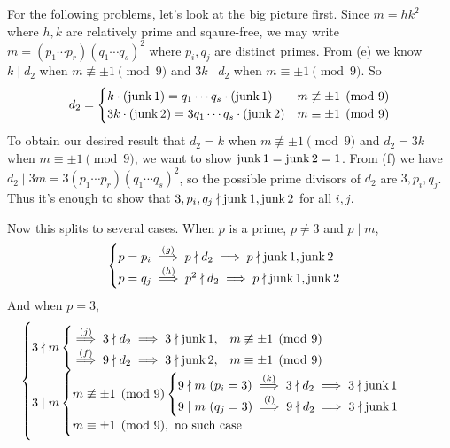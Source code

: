 \documentclass[../Marcus.tex]{subfiles}
\begin{document}
For the following problems, let's look at the big picture first. Since $m=hk^2$ where $h,k$ are relatively prime and sqaure-free, we may write $m=(p_1\cdots p_r)(q_1\cdots q_s)^2$ where $p_i,q_j$ are distinct primes. From (e) we know $k\mid d_2$ when $m\not\equiv \pm1 \pmod{9}$ and $3k\mid d_2$ when $m\equiv \pm1 \pmod{9}$. So
$$
d_2 =
\begin{cases}
    k\cdot(\operatorname{junk}1) = q_1\cdots q_s\cdot(\operatorname{junk}1) & m\not\equiv \pm1 \pmod{9} \\
    3k\cdot(\operatorname{junk}2) = 3q_1\cdots q_s\cdot(\operatorname{junk}2) & m\equiv \pm1 \pmod{9}
\end{cases}
$$
To obtain our desired result that $d_2=k$ when $m\not\equiv \pm1 \pmod{9}$ and $d_2=3k$ when $m\equiv \pm1 \pmod{9}$, we want to show $\operatorname{junk}1=\operatorname{junk}2=1$. From (f) we have $d_2\mid 3m=3(p_1\cdots p_r)(q_1\cdots q_s)^2$, so the possible prime divisors of $d_2$ are $3,p_i,q_j$. Thus it's enough to show that $3,p_i,q_j\nmid\operatorname{junk}1,\operatorname{junk}2$ for all $i,j$.

Now this splits to several cases. When $p$ is a prime, $p\neq 3$ and $p\mid m$,
$$
\begin{cases}
    p=p_i \overset{(g)}{\implies} p\nmid d_2 \implies p\nmid\jk1,\jk2 \\
    p=q_j \overset{(h)}{\implies} p^2\nmid d_2 \implies p\nmid\jk1,\jk2 \\
\end{cases}
$$
And when $p=3$,
$$
\begin{cases}
    3\nmid m
    \begin{cases}
        \overset{(j)}{\implies} 3\nmid d_2 \implies 3\nmid\jk1, & m\not\equiv \pm1 \pmod{9} \\
        \overset{(f)}{\implies} 9\nmid d_2 \implies 3\nmid\jk2, & m\equiv \pm1 \pmod{9}
    \end{cases}\\

3\mid m
    \begin{cases}
        m\not\equiv \pm1 \pmod{9}
        \begin{cases}
            9\nmid m \ ( p_i=3) \overset{(k)}{\implies} 3\nmid d_2 \implies 3\nmid\jk1 \\
            9\mid m  \ ( q_j=3) \overset{(l)}{\implies} 9\nmid d_2 \implies 3\nmid\jk1 
        \end{cases} \\
        m\equiv \pm1 \pmod{9}, \text{ no such case}
    \end{cases}
\end{cases}
$$
\end{document}
